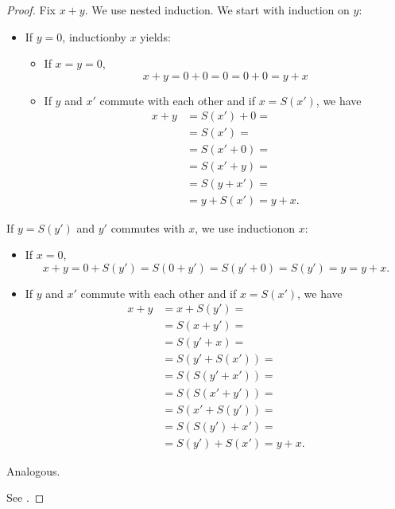 \begin{proof}
   Fix \( x + y \). We use nested induction\IND. We start with induction on \( y \):
  \begin{itemize}
    \item If \( y = 0 \), induction\IND by \( x \) yields:
    \begin{itemize}
      \item If \( x = y = 0 \),
      \begin{equation*}
        x + y = 0 + 0 = 0 = 0 + 0 = y + x
      \end{equation*}

      \item If \( y \) and \( x' \) commute with each other and if \( x = S(x') \), we have
      \begin{align*}
        x + y
         & =
        S(x') + 0
        =    \\ &=
        S(x')
        =    \\ &=
        S(x' + 0)
        =    \\ &=
        S(x' + y)
        =    \\ &=
        S(y + x')
        =    \\ &=
        y + S(x')
        =
        y + x.
      \end{align*}
    \end{itemize}
  \end{itemize}

  \item If \( y = S(y') \) and \( y' \) commutes with \( x \), we use induction\IND on \( x \):
  \begin{itemize}
    \item If \( x = 0 \),
    \begin{equation*}
      x + y = 0 + S(y') = S(0 + y') = S(y' + 0) = S(y') = y = y + x.
    \end{equation*}

    \item If \( y \) and \( x' \) commute with each other and if \( x = S(x') \), we have
    \begin{align*}
      x + y
       & =
      x + S(y')
      =    \\ &=
      S(x + y')
      =    \\ &=
      S(y' + x)
      =    \\ &=
      S(y' + S(x'))
      =    \\ &=
      S(S(y' + x'))
      =    \\ &=
      S(S(x' + y'))
      =    \\ &=
      S(x' + S(y'))
      =    \\ &=
      S(S(y') + x')
      =    \\ &=
      S(y') + S(x')
      =
      y + x.
    \end{align*}
  \end{itemize}

   Analogous.

   See .
\end{proof}
